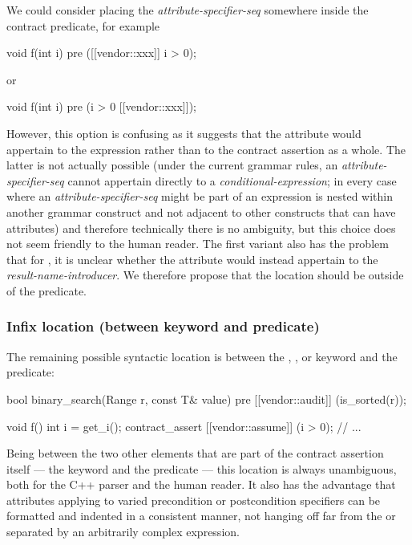 We could consider placing the  \emph{attribute-specifier-seq} somewhere inside the contract predicate, for example
\begin{codeblock}
void f(int i) 
  pre ([[vendor::xxx]] i > 0);
\end{codeblock}
or
\begin{codeblock}
void f(int i) 
  pre (i > 0 [[vendor::xxx]]);
\end{codeblock}
However, this option is confusing as it suggests that the attribute would appertain to the expression rather than to the contract assertion as a whole. The latter is not actually possible (under the current grammar rules, an \emph{attribute-specifier-seq} cannot appertain directly to a \emph{conditional-expression}; in every case where an \emph{attribute-specifier-seq} might be part of an expression is nested within another grammar construct and not adjacent to other constructs that can have attributes) and therefore technically there is no ambiguity, but this choice does not seem friendly to the human reader. The  first variant also has the problem that for , it is unclear whether the attribute would instead appertain to the \emph{result-name-introducer}. We therefore propose that the location should be outside of the predicate.

\subsubsection{Infix location (between keyword and predicate)}

The remaining possible syntactic location is between the , , or  keyword and the predicate:

\begin{codeblock}
bool binary_search(Range r, const T& value)
  pre [[vendor::audit]] (is_sorted(r));
  
void f() {
  int i = get_i();
  contract_assert [[vendor::assume]] (i > 0);
  // ...
}
\end{codeblock}

Being between the two other elements that are part of the contract assertion itself --- the keyword and the predicate --- this location is always unambiguous, both for the C++ parser and the human reader. It also has the advantage that attributes applying to varied precondition or postcondition specifiers can be formatted and indented in a consistent manner, not hanging off far from the  or  separated by an arbitrarily complex expression.

